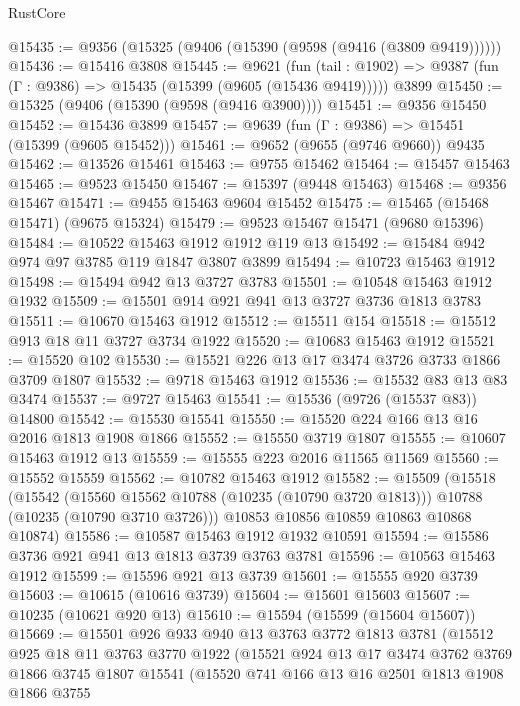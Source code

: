 \begin{lexlean}{RustCore}
\begin{coremodule}
@15435 := @9356 (@15325 (@9406 (@15390 (@9598 (@9416 (@3809 @9419))))))
@15436 := @15416 @3808
@15445 := @9621
    (fun (tail : @1902) => @9387 (fun (Γ : @9386) => @15435 (@15399 (@9605 (@15436 @9419)))))
    @3899
@15450 := @15325 (@9406 (@15390 (@9598 (@9416 @3900))))
@15451 := @9356 @15450
@15452 := @15436 @3899
@15457 := @9639 (fun (Γ : @9386) => @15451 (@15399 (@9605 @15452)))
@15461 := @9652 (@9655 (@9746 @9660)) @9435
@15462 := @13526 @15461
@15463 := @9755 @15462
@15464 := @15457 @15463
@15465 := @9523 @15450
@15467 := @15397 (@9448 @15463)
@15468 := @9356 @15467
@15471 := @9455 @15463 @9604 @15452
@15475 := @15465 (@15468 @15471) (@9675 @15324)
@15479 := @9523 @15467 @15471 (@9680 @15396)
@15484 := @10522 @15463 @1912 @1912 @119 @13
@15492 := @15484 @942 @974 @97 @3785 @119 @1847 @3807 @3899
@15494 := @10723 @15463 @1912
@15498 := @15494 @942 @13 @3727 @3783
@15501 := @10548 @15463 @1912 @1932
@15509 := @15501 @914 @921 @941 @13 @3727 @3736 @1813 @3783
@15511 := @10670 @15463 @1912
@15512 := @15511 @154
@15518 := @15512 @913 @18 @11 @3727 @3734 @1922
@15520 := @10683 @15463 @1912
@15521 := @15520 @102
@15530 := @15521 @226 @13 @17 @3474 @3726 @3733 @1866 @3709 @1807
@15532 := @9718 @15463 @1912
@15536 := @15532 @83 @13 @83 @3474
@15537 := @9727 @15463
@15541 := @15536 (@9726 (@15537 @83)) @14800
@15542 := @15530 @15541
@15550 := @15520 @224 @166 @13 @16 @2016 @1813 @1908 @1866
@15552 := @15550 @3719 @1807
@15555 := @10607 @15463 @1912 @13
@15559 := @15555 @223 @2016 @11565 @11569
@15560 := @15552 @15559
@15562 := @10782 @15463 @1912
@15582 := @15509
    (@15518
      (@15542
        (@15560 @15562 @10788 (@10235 (@10790 @3720 @1813)))
        @10788
        (@10235 (@10790 @3710 @3726)))
      @10853
      @10856
      @10859
      @10863
      @10868
      @10874)
@15586 := @10587 @15463 @1912 @1932 @10591
@15594 := @15586 @3736 @921 @941 @13 @1813 @3739 @3763 @3781
@15596 := @10563 @15463 @1912
@15599 := @15596 @921 @13 @3739
@15601 := @15555 @920 @3739
@15603 := @10615 (@10616 @3739)
@15604 := @15601 @15603
@15607 := @10235 (@10621 @920 @13)
@15610 := @15594 (@15599 (@15604 @15607))
@15669 := @15501
    @926
    @933
    @940
    @13
    @3763
    @3772
    @1813
    @3781
    (@15512
      @925
      @18
      @11
      @3763
      @3770
      @1922
      (@15521
        @924
        @13
        @17
        @3474
        @3762
        @3769
        @1866
        @3745
        @1807
        @15541
        (@15520
          @741
          @166
          @13
          @16
          @2501
          @1813
          @1908
          @1866
          @3755

\end{coremodule}
\end{lexlean}
